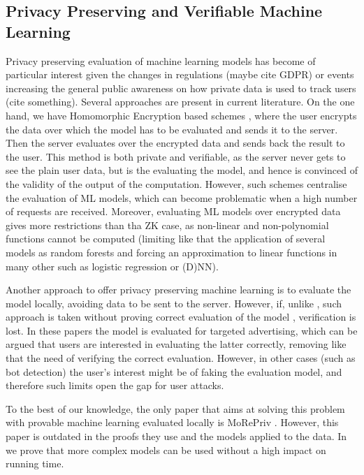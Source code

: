 \subsection{Privacy Preserving and Verifiable Machine Learning}

Privacy preserving evaluation of machine learning models has become of particular interest given the changes in regulations (maybe cite GDPR) or events increasing the general public awareness on how private data is used to track users (cite something). 
Several approaches are present in current literature. On the one hand, we have Homomorphic Encryption based schemes \cite{Dowlin:2016:CAN:3045390.3045413,mlconfidential,bos2013private}, where the user encrypts the data over which the model has to be evaluated and sends it to the server. Then the server evaluates over the encrypted data and sends back the result to the user. This method is both private and verifiable, as the server never gets to see the plain user data, but is the evaluating the model, and hence is convinced of the validity of the output of the computation. 
However, such schemes centralise the evaluation of ML models, which can become problematic when a high number of requests are received. 
Moreover, evaluating ML models over encrypted data gives more restrictions than tha ZK case, as non-linear and non-polynomial functions cannot be computed (limiting like that the application of several models as random forests and forcing an approximation to linear functions in many other such as logistic regression or (D)NN). 

Another approach to offer privacy preserving machine learning is to evaluate the model locally, avoiding data to be sent to the server. However, if, unlike \name, such approach is taken without proving correct evaluation of the model \cite{DBLP:journals/corr/abs-1710-03275,Bilenko:2011:PCP:2020408.2020475,Guha:2011:PPP:1972457.1972475}, verification is lost. In these papers the model is evaluated for targeted advertising, which can be argued that users are interested in evaluating the latter correctly, removing like that the need of verifying the correct evaluation. However, in other cases (such as bot detection) the user's interest might be of faking the evaluation model, and therefore such limits open the gap for user attacks. 

To the best of our knowledge, the only paper that aims at solving this problem with provable machine learning evaluated locally is MoRePriv \cite{Davidson:2014:MMO:2664243.2664266}. However, this paper is outdated in the proofs they use and the models applied to the data. In \name we prove that more complex models can be used without a high impact on running time. 